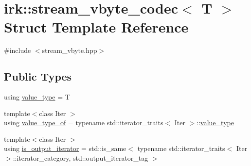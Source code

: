 \hypertarget{structirk_1_1stream__vbyte__codec}{}\section{irk\+:\+:stream\+\_\+vbyte\+\_\+codec$<$ T $>$ Struct Template Reference}
\label{structirk_1_1stream__vbyte__codec}


{\ttfamily \#include $<$stream\+\_\+vbyte.\+hpp$>$}

\subsection*{Public Types}
\begin{DoxyCompactItemize}
\item 
using \mbox{\hyperlink{structirk_1_1stream__vbyte__codec_a770dc53873c94b550afb65a87b33fb67}{value\+\_\+type}} = T
\item 
{\footnotesize template$<$class Iter $>$ }\\using \mbox{\hyperlink{structirk_1_1stream__vbyte__codec_a795a3b9b804c21011d5021417712b8c7}{value\+\_\+type\+\_\+of}} = typename std\+::iterator\+\_\+traits$<$ Iter $>$\+::\mbox{\hyperlink{structirk_1_1stream__vbyte__codec_a770dc53873c94b550afb65a87b33fb67}{value\+\_\+type}}
\item 
{\footnotesize template$<$class Iter $>$ }\\using \mbox{\hyperlink{structirk_1_1stream__vbyte__codec_a7f9d7916a78880d1c4b3798e8b161eb2}{is\+\_\+output\+\_\+iterator}} = std\+::is\+\_\+same$<$ typename std\+::iterator\+\_\+traits$<$ Iter $>$\+::iterator\+\_\+category, std\+::output\+\_\+iterator\+\_\+tag $>$
\end{DoxyCompactItemize}
